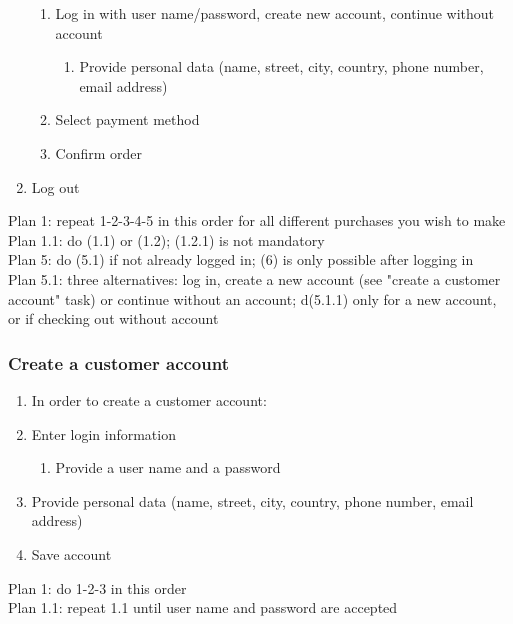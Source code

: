 \begin{enumerate}[label*=\arabic*.,start=0,itemsep=-5pt]
\begin{enumerate}[label*=\arabic*.,itemsep=-5pt]
      \item Log in with user name/password, create new account, continue without account
				\begin{enumerate}[label*=\arabic*.,itemsep=-5pt]
	  			\item Provide personal data (name, street, city, country, phone number, email address)
        \end{enumerate}
      \item Select payment method
      \item Confirm order      
    \end{enumerate}
  \item Log out
\end{enumerate}
Plan 1: repeat 1-2-3-4-5 in this order for all different purchases you wish to make\\
Plan 1.1: do (1.1) or (1.2); (1.2.1) is not mandatory\\
Plan 5: do (5.1) if not already logged in; (6) is only possible after logging in\\
Plan 5.1: three alternatives: log in, create a new account (see "create a customer account" task) or continue without an account; d(5.1.1) only for a new account, or if checking out without account

\subsubsection{Create a customer account}
\begin{enumerate}[label*=\arabic*.,start=0,itemsep=-5pt]
  \item In order to create a customer account:
  \item Enter login information
  \begin{enumerate}[label*=\arabic*.,itemsep=-5pt]
		\item Provide a user name and a password
	\end{enumerate}
  \item Provide personal data (name, street, city, country, phone number, email address)
  \item Save account
\end{enumerate}
Plan 1: do 1-2-3 in this order\\
Plan 1.1: repeat 1.1 until user name and password are accepted

